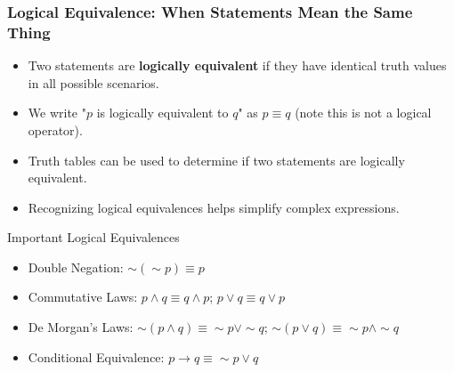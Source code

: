 \documentclass{beamer}
\begin{document}
                        \begin{frame}
                        \frametitle{Logical Equivalence: When Statements Mean the Same Thing}
                        \begin{itemize}
                            \item Two statements are \textbf{logically equivalent} if they have identical truth values in all possible scenarios.
                            \item We write "$p$ is logically equivalent to $q$" as $p \equiv q$ (note this is not a logical operator).
                            \item Truth tables can be used to determine if two statements are logically equivalent.
                            \item Recognizing logical equivalences helps simplify complex expressions.
                        \end{itemize}
                        
                        \begin{block}{Important Logical Equivalences}
                            \scriptsize
                        \begin{itemize}
                            \item Double Negation: $\sim(\sim p) \equiv p$
                            \item Commutative Laws: $p \wedge q \equiv q \wedge p$; $p \vee q \equiv q \vee p$
                            \item De Morgan's Laws: $\sim(p \wedge q) \equiv \sim p \vee \sim q$; $\sim(p \vee q) \equiv \sim p \wedge \sim q$
                            \item Conditional Equivalence: $p \rightarrow q \equiv \sim p \vee q$
                        \end{itemize}
                        \end{block}
                        \end{frame}
                        
\end{document}
